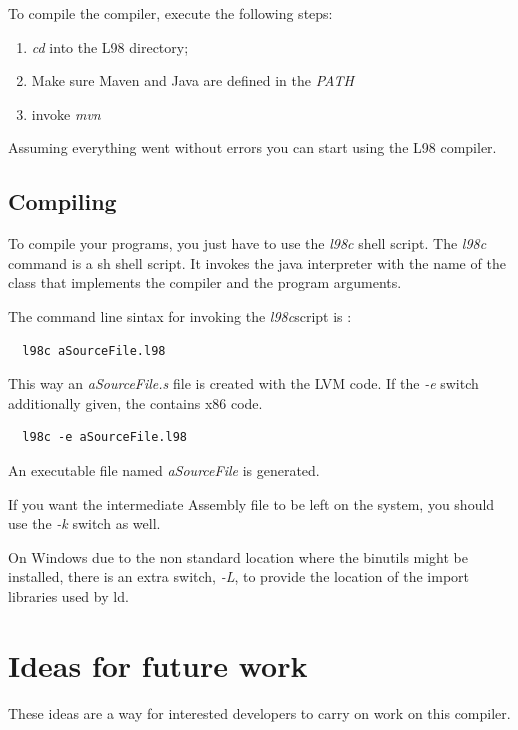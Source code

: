 \documentclass[a4paper, 11pt]{report}
\newcommand{\switch}[1]{\textsl{#1}}
\begin{document}
To compile the compiler, execute the following steps:

\begin{enumerate}
\item \emph{cd} into the L98 directory;
\item Make sure Maven and Java are defined in the \emph{PATH}
\item invoke \emph{mvn}
\end{enumerate}

  Assuming everything went without errors you can start using the L98 compiler.

\section{Compiling}
  To compile your programs, you just have to use the \emph{l98c} shell script.
The \emph{l98c} command is a sh shell script. It invokes the java interpreter
with the name of the class that implements the compiler and the program arguments.

The command line sintax for invoking the \emph{l98c}script is :

\begin{verbatim}
  l98c aSourceFile.l98
\end{verbatim}

This way an \emph{aSourceFile.s} file is created with the LVM code. If the
\switch{-e} switch additionally given, the contains x86 code.

\begin{verbatim}
  l98c -e aSourceFile.l98
\end{verbatim}

An executable file named \emph{aSourceFile} is generated.

If you want the intermediate Assembly file to be left on the system, you should
use the \switch{-k} switch as well.

On Windows due to the non standard location where the binutils might be installed, there is
an extra switch, \switch{-L}, to provide the location of the import libraries used by ld.

\chapter{Ideas for future work}
\label{sct:ideas}

These ideas are a way for interested developers to carry on work on this compiler.
\end{document}
